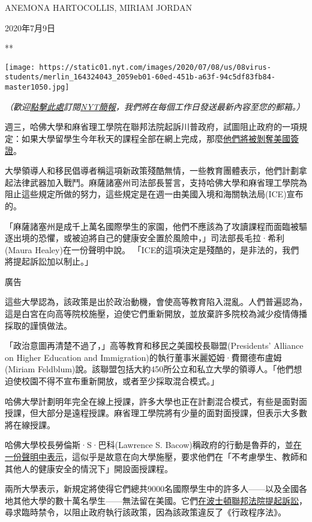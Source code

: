 ANEMONA HARTOCOLLIS, MIRIAM JORDAN

2020年7月9日

**

\texttt{[image: https://static01.nyt.com/images/2020/07/08/us/08virus-students/merlin\_164324043\_2059eb01-60ed-451b-a63f-94c5df83fb84-master1050.jpg]}

\emph{（歡迎}\href{https://sso.nytcn.me/email/?source=top-right}{\emph{點擊此處}}\emph{訂閱}\href{https://m.cn.nytimes.com/morning-brief/}{\emph{NYT簡報}}\emph{，我們將在每個工作日發送最新內容至您的郵箱。）}

週三，哈佛大學和麻省理工學院在聯邦法院起訴川普政府，試圖阻止政府的一項規定：如果大學留學生今年秋天的課程全部在網上完成，那麼\href{https://cn.nytimes.com/usa/20200708/student-visas-coronavirus/}{他們將被剝奪美國簽證}。

大學領導人和移民倡導者稱這項新政策殘酷無情，一些教育團體表示，他們計劃拿起法律武器加入戰鬥。麻薩諸塞州司法部長誓言，支持哈佛大學和麻省理工學院為阻止這些規定所做的努力，這些規定是在週一由美國入境和海關執法局(ICE)宣布的。

「麻薩諸塞州是成千上萬名國際學生的家園，他們不應該為了攻讀課程而面臨被驅逐出境的恐懼，或被迫將自己的健康安全置於風險中，」司法部長毛拉·希利(Maura
Healey)在一份聲明中說。
「ICE的這項決定是殘酷的，是非法的，我們將提起訴訟加以制止。」

廣告

這些大學認為，該政策是出於政治動機，會使高等教育陷入混亂。人們普遍認為，這是白宮在向高等院校施壓，迫使它們重新開放，並放棄許多院校為減少疫情傳播採取的謹慎做法。

「政治意圖再清楚不過了，」高等教育和移民之美國校長聯盟(Presidents'
Alliance on Higher Education and
Immigration)的執行董事米麗婭姆·費爾德布盧姆(Miriam
Feldblum)說。該聯盟包括大約450所公立和私立大學的領導人。「他們想迫使校園不得不宣布重新開放，或者至少採取混合模式。」

哈佛大學計劃明年完全在線上授課，許多大學也正在計劃混合模式，有些是面對面授課，但大部分是遠程授課。麻省理工學院將有少量的面對面授課，但表示大多數將在線授課。

哈佛大學校長勞倫斯·S·巴科(Lawrence S.
Bacow)稱政府的行動是魯莽的，並\href{https://www.harvard.edu/president/news/2020/supporting-international-students?utm_source=twitter\&utm_campaign=hu-twitter-general\&utm_medium=social}{在一份聲明中表示}，這似乎是故意在向大學施壓，要求他們在「不考慮學生、教師和其他人的健康安全的情況下」開設面授課程。

兩所大學表示，新規定將使得它們總共9000名國際學生中的許多人------以及全國各地其他大學的數十萬名學生------無法留在美國。它們\href{https://www.harvard.edu/sites/default/files/content/sevp_filing.pdf}{在波士頓聯邦法院提起訴訟}，尋求臨時禁令，以阻止政府執行該政策，因為該政策違反了《行政程序法》。

